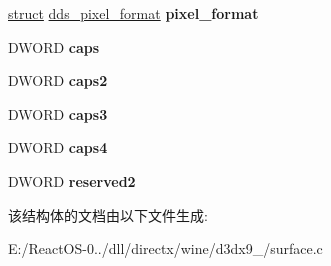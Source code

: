 \begin{DoxyCompactItemize}
\hyperlink{interfacestruct}{struct} \hyperlink{structdds__pixel__format}{dds\+\_\+pixel\+\_\+format} {\bfseries pixel\+\_\+format}
\item 
\mbox{\label{structdds__header_aadf4ea28840be5a6ece7ce709461b1cf}} 
D\+W\+O\+RD {\bfseries caps}
\item 
\mbox{\label{structdds__header_aa97b1a2094ae649e8e6460ae031dfb2c}} 
D\+W\+O\+RD {\bfseries caps2}
\item 
\mbox{\label{structdds__header_a2c830a4eed17af39918b7d2c1166a87c}} 
D\+W\+O\+RD {\bfseries caps3}
\item 
\mbox{\label{structdds__header_af2a0c03bc67cf5a9fee9297b9add79ac}} 
D\+W\+O\+RD {\bfseries caps4}
\item 
\mbox{\label{structdds__header_a670880078f0bcf7c36d91c1a19a2efde}} 
D\+W\+O\+RD {\bfseries reserved2}
\end{DoxyCompactItemize}


该结构体的文档由以下文件生成\+:\begin{DoxyCompactItemize}
\item 
E\+:/\+React\+O\+S-\/0../dll/directx/wine/d3dx9\+\_/surface.\+c\end{DoxyCompactItemize}
